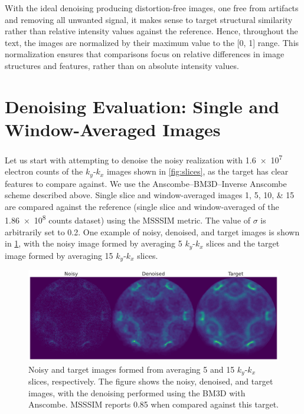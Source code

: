 With the ideal denoising producing distortion-free images, one free from artifacts and removing all unwanted signal, it makes sense to target structural similarity rather than relative intensity values against the reference. Hence, throughout the text, the images are normalized by their maximum value to the [\num{0}, \num{1}] range. This normalization ensures that comparisons focus on relative differences in image structures and features, rather than on absolute intensity values.

\section{Denoising Evaluation: Single and Window-Averaged Images}
Let us start with attempting to denoise the noisy realization with \num{1.6e7} electron counts of the $k_y$-$k_x$ images shown in \cref{fig:slices}, as the target has clear features to compare against. We use the Anscombe--\gls{BM3D}--Inverse Anscombe scheme described above. Single slice and window-averaged images \numlist{1;5;10;15} are compared against the reference (single slice and window-averaged of the \num{1.86e8} counts dataset) using the \gls{MSSSIM} metric. The value of $\sigma$ is arbitrarily set to \num{0.2}. One example of noisy, denoised, and target images is shown in \cref{fig:noisy-denoised-ref-16M-avg-bm3d}, with the noisy image formed by averaging 5 $k_y$-$k_x$ slices and the target image formed by averaging 15 $k_y$-$k_x$ slices.

\begin{figure}[h]
    \centering
    \includegraphics[width=1\linewidth]{images/noisy_denoised_ref_16M_avg_bm3d.pdf}
    \caption{Noisy and target images formed from averaging 5 and 15 $k_y$-$k_x$ slices, respectively. The figure shows the noisy, denoised, and target images, with the denoising performed using the \gls{BM3D} with Anscombe. \gls{MSSSIM} reports \num{0.85} when compared against this target.}
    \label{fig:noisy-denoised-ref-16M-avg-bm3d}
\end{figure}


